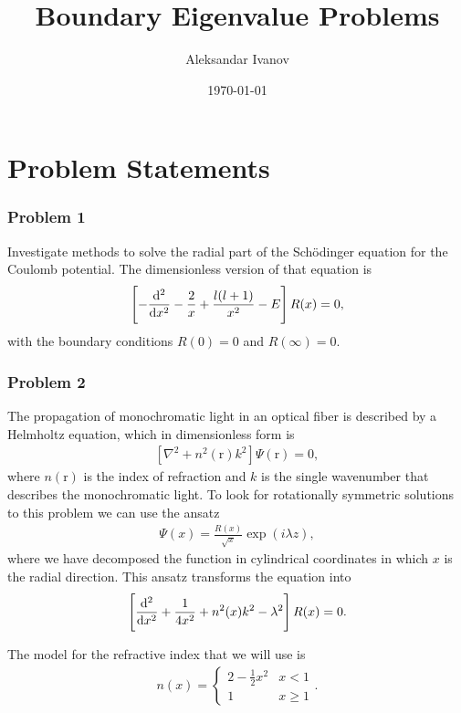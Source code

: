 \documentclass[10pt,a4paper,twocolumn]{article}
\renewcommand{\vec}[1]{\bm{\mathrm{#1}}}
\begin{document}
\title{Boundary Eigenvalue Problems}
\author{Aleksandar Ivanov}
\date{\today}
\maketitle

\section{Problem Statements}

\subsubsection*{Problem 1}

Investigate methods to solve the radial part of the Sch\"odinger equation for the Coulomb potential. The dimensionless version of that equation is
%
\begin{align}\label{eq:1diffeq}
    \left[ - \frac{\mathrm{d}^2}{\dif x^2} -\frac{2}{x} + \frac{l(l+1)}{x^2} - E \right] R(x) = 0,
\end{align}
%
with the boundary conditions $R(0) = 0$ and $R(\infty) = 0$.

\subsubsection*{Problem 2}

The propagation of monochromatic light in an optical fiber is described by a Helmholtz equation, which in dimensionless form is
%
\begin{align}
    \left[ \nabla^2 + n^2(\vec{r}) k^2 \right] \Psi(\vec{r}) = 0,
\end{align}
%
where $n(\vec{r})$ is the index of refraction and $k$ is the single wavenumber that describes the monochromatic light. To look for rotationally symmetric solutions to this problem we can use the ansatz
%
\begin{align}
    \Psi(x) = \frac{R(x)}{\sqrt{x}} \exp(i \lambda z),
\end{align}
%
where we have decomposed the function in cylindrical coordinates in which $x$ is the radial direction. This ansatz transforms the equation into
%
\begin{align}\label{eq:2diffeq}
    \left[ \frac{\mathrm{d}^2}{\dif x^2} + \frac{1}{4x^2} + n^2(x)k^2 - \lambda^2 \right] R(x) = 0.
\end{align}

The model for the refractive index that we will use is
%
\begin{align}\label{eq:2n}
    n(x) = \begin{cases}
        2 - \frac{1}{2}x^2 & x < 1\\
        1 & x \geq 1
    \end{cases}.
\end{align}
\end{document}
